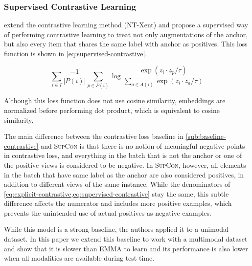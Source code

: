 \documentclass[10pt]{article} %
\newcommand{\ours}{\textsc{EMMA}}
\newcommand{\supcon}{\textsc{SupCon}}
\begin{document}
\subsubsection{Supervised Contrastive Learning}
\label{sub:baseline-supcon}

\citet{NEURIPS2020_supervised_contrastive} extend the contrastive learning method (NT-Xent) and propose a supervised way of performing contrastive learning to treat not only augmentations of the anchor, but also every item that shares the same label with anchor as positives. This loss function is shown in \cref{eq:supervised-contrastive}.

\begin{equation}\label{eq:supervised-contrastive}
    \sum_{i \in I} \frac{-1}{|P(i)|} \sum_{p \in P(i)} \log \frac{\exp (z_i \cdot z_p / \tau) }{\sum_{a \in A(i)} \exp (z_i \cdot z_a / \tau)}
\end{equation}


Although this loss function does not use cosine similarity, embeddings are normalized before performing dot product, which is equivalent to cosine similarity.

The main difference between the contrastive loss baseline in \cref{sub:baseline-contrastive} and \supcon{} is that there is no notion of meaningful negative points in contrastive loss, and everything in the batch that is not the anchor or one of the positive views is considered to be negative. In \supcon{}, however, all elements in the batch that have same label as the anchor are also considered positives, in addition to different views of the same instance. While the denominators of \cref{eq:explicit-contrastive,eq:supervised-contrastive} stay the same, this subtle difference affects the numerator and includes more positive examples, which prevents the unintended use of actual positives as negative examples.

While this model is a strong baseline, the authors applied it to a unimodal dataset. In this paper we extend this baseline to work with a multimodal dataset and show that it is slower than \ours{} to learn and its performance is also lower when all modalities are available during test time.
\end{document}
